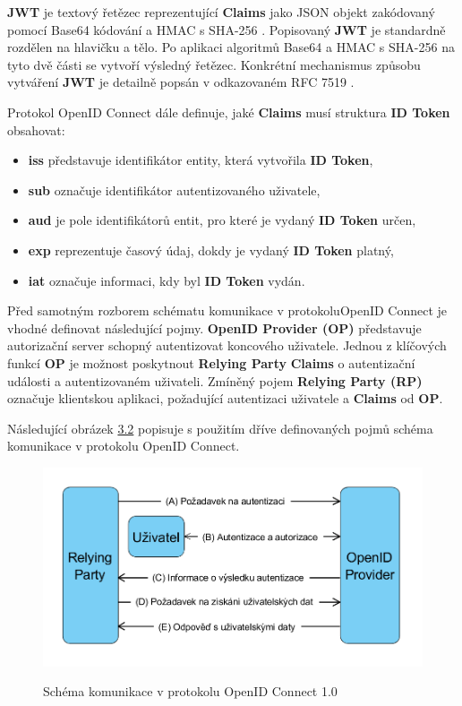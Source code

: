 \documentclass[
  printed, %
  twoside, %
  table,   %
  nolof,     %
  nolot,     %
]{fithesis3}
\begin{document}
\par

\textbf{JWT} je textový řetězec reprezentující \textbf{Claims} jako JSON objekt \cite{rfc8259}\break zakódovaný pomocí Base64 \cite{rfc4648} kódování a HMAC s SHA-256 \cite{rfc4868}. Popisovaný \textbf{JWT} je standardně rozdělen na hlavičku a tělo. Po aplikaci algoritmů Base64 a HMAC s SHA-256 na tyto dvě části se vytvoří výsledný řetězec. Konkrétní mechanismus způsobu vytváření \textbf{JWT} je detailně popsán v odkazovaném RFC 7519 \cite{rfc7519}. \par

Protokol OpenID Connect dále definuje, jaké \textbf{Claims} musí struktura \textbf{ID Token} obsahovat:

\begin{itemize}
    \item \textbf{iss} představuje identifikátor entity, která vytvořila \textbf{ID Token}, 
    \item \textbf{sub} označuje identifikátor autentizovaného uživatele, 
    \item \textbf{aud} je pole identifikátorů entit, pro které je vydaný \textbf{ID Token} určen,
    \item \textbf{exp} reprezentuje časový údaj, dokdy je vydaný \textbf{ID Token} platný,
    \item \textbf{iat} označuje informaci, kdy byl \textbf{ID Token} vydán.
\end{itemize}
\par

Před samotným rozborem schématu komunikace v protokolu\break OpenID Connect je vhodné definovat následující pojmy. \textbf{OpenID Provider (OP)} představuje autorizační server schopný autentizovat koncového uživatele. Jednou z klíčových funkcí \textbf{OP} je možnost poskytnout \textbf{Relying Party} \textbf{Claims} o autentizační události a autentizovaném uživateli. Zmíněný pojem \textbf{Relying Party (RP)} označuje klientskou aplikaci, požadující autentizaci uživatele a \textbf{Claims} od \textbf{OP}. \par
Následující obrázek \hyperref[fig:oidc]{3.2} popisuje s použitím dříve definovaných pojmů schéma komunikace v protokolu OpenID Connect.

\begin{figure}[H]
\caption{Schéma komunikace v protokolu OpenID Connect 1.0}
\centering
\includegraphics[width=12.8cm]{pics/diplomkaOIDC} 
\label{fig:oidc}
\end{figure}
\par 
\end{document}
